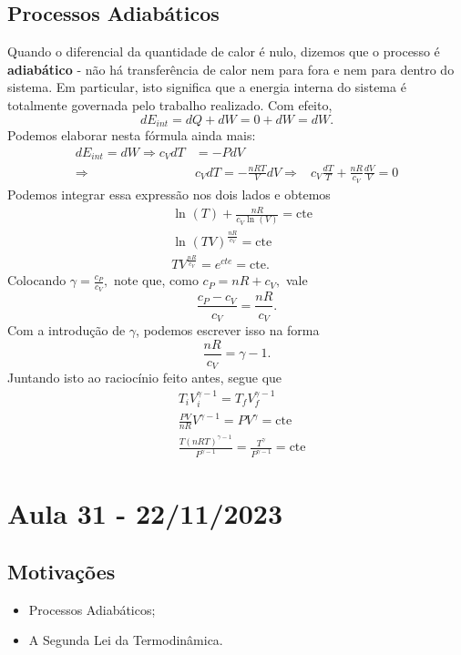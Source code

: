 \documentclass{article}
\begin{document}
\subsection{Processos Adiabáticos}
Quando o diferencial da quantidade de calor é nulo, dizemos que o processo é \textbf{adiabático} - não há transferência
de calor nem para fora e nem para dentro do sistema. Em particular, isto significa que a energia interna do sistema é totalmente
governada pelo trabalho realizado. Com efeito, 
\[
  dE_{int} = dQ + dW = 0 + dW = dW.
\]
Podemos elaborar nesta fórmula ainda mais:
\begin{align*}
  dE_{int} = dW \Rightarrow c_{V}dT &= - PdV\\
  \Rightarrow& c_{V}dT = -\frac{nRT}{V}dV
  \Rightarrow& c_{V}\frac{dT}{T} + \frac{nR}{c_{V}}\frac{dV}{V} = 0
\end{align*}
Podemos integrar essa expressão nos dois lados e obtemos
\begin{align*}
  &\ln^{}{(T)} + \frac{nR}{c_{V}\ln^{}{(V)}} = \mathrm{cte}\\
  &\ln^{}{(TV)^{\frac{nR}{c_{V}}}} = \mathrm{cte}\\
  &TV^{\frac{nR}{c_{V}}} = e^{cte} = \mathrm{cte}.
\end{align*}
Colocando \(\gamma  = \frac{c_{P}}{c_{V}},\) note que, como \(c_{P} = nR + c_{V},\) vale 
\[
  \frac{c_{P}-c_{V}}{c_{V}} = \frac{nR}{c_{V}}.
\]
Com a introdução de \(\gamma \), podemos escrever isso na forma 
\[
  \frac{nR}{c_{V}} = \gamma - 1.
\]
Juntando isto ao raciocínio feito antes, segue que 
\begin{align*}
  &T_{i}V_{i}^{\gamma - 1} = T_{f}V_{f}^{\gamma - 1}\\
  &\frac{PV}{nR}V^{\gamma - 1} = PV^{\gamma } = \mathrm{cte}\\
  &\frac{T(nRT)^{\gamma - 1}}{P^{\gamma - 1}} = \frac{T^{\gamma }}{P^{\gamma - 1}} = \mathrm{cte}
\end{align*}
\newpage

\section{Aula 31 - 22/11/2023}
\subsection{Motivações}
\begin{itemize}
  \item Processos Adiabáticos;
  \item A Segunda Lei da Termodinâmica.
\end{itemize}
\end{document}
